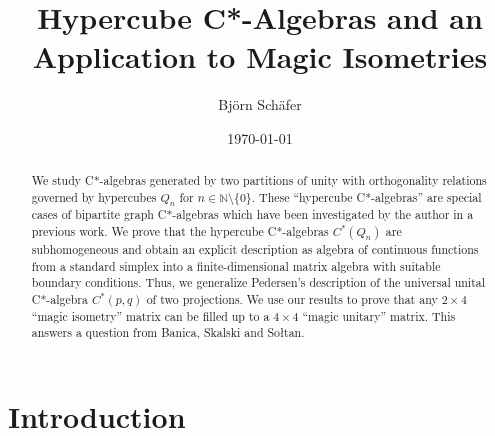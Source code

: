 \documentclass[a4paper]{amsart}
\title[Hypercube C*-Algebras]{Hypercube C*-Algebras and an Application to Magic Isometries}
\date{\today}
\author{Bj\"orn Sch\"afer}
\newcommand{\N}{\mathbb{N}}
\begin{document}

\begin{abstract}
    We study C*-algebras generated by two partitions of unity with orthogonality relations governed by hypercubes $Q_n$ for $n \in \N \setminus \{0\}$. These ``hypercube C*-algebras'' are special cases of bipartite graph C*-algebras which have been investigated by the author in a previous work. 
    We prove that the hypercube C*-algebras $C^\ast(Q_n)$ are subhomogeneous and obtain an explicit description as algebra of continuous functions from a standard simplex into a finite-dimensional matrix algebra with suitable boundary conditions. 
    Thus, we generalize Pedersen's description of the universal unital C*-algebra $C^\ast(p,q)$ of two projections. 
    We use our results to prove that any $2 \times 4$ ``magic isometry'' matrix can be filled up to a $4 \times 4$ ``magic unitary'' matrix. This answers a question from Banica, Skalski and So\l tan.
\end{abstract}

\maketitle

\setcounter{tocdepth}{1}    %
\tableofcontents

\section{Introduction}
\label{sec::introduction}
\end{document}
